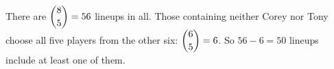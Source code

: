 There are $\dbinom85=56$ lineups in all. Those containing neither Corey nor Tony choose all five players from the other six: $\dbinom65=6$. So $56-6=\boxed{50}$ lineups include at least one of them.
